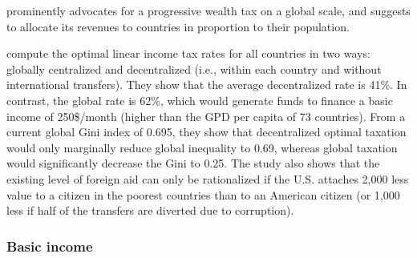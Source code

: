  prominently advocates for a progressive wealth tax on a global scale, and  suggests to allocate its revenues to countries in proportion to their population. %

 compute the optimal linear income tax rates for all countries in two ways: globally centralized and decentralized (i.e., within each country and without international transfers). They show that the average decentralized rate is 41\%. In contrast, the global rate is 62\%, which would generate funds to finance a basic income of 250\$/month (higher than the GPD per capita of 73 countries). From a current global Gini index of 0.695, they show that decentralized optimal taxation would only marginally reduce global inequality to 0.69, whereas global taxation would significantly decrease the Gini to 0.25. The study also shows that the existing level of foreign aid can only be rationalized if the U.S. attaches 2,000 less value to a citizen in the poorest countries than to an American citizen (or 1,000 less if half of the transfers are diverted due to corruption). 


\subsubsection{Basic income}\label{subsubsec:literature_basic_income}

